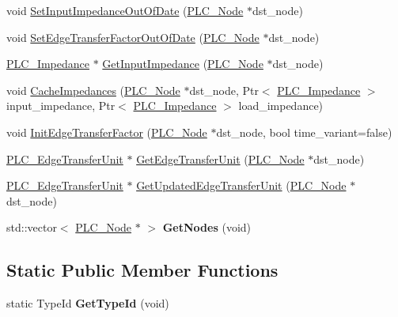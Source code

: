 \begin{DoxyCompactItemize}
\item 
void \hyperlink{classns3_1_1PLC__Edge_a97475cf3a29dc9f37a4decab57f964c9}{\-Set\-Input\-Impedance\-Out\-Of\-Date} (\hyperlink{classns3_1_1PLC__Node}{\-P\-L\-C\-\_\-\-Node} $\ast$dst\-\_\-node)
\item 
void \hyperlink{classns3_1_1PLC__Edge_a6d67f5eed3ae68f7c33b224494a3d47c}{\-Set\-Edge\-Transfer\-Factor\-Out\-Of\-Date} (\hyperlink{classns3_1_1PLC__Node}{\-P\-L\-C\-\_\-\-Node} $\ast$dst\-\_\-node)
\item 
\hyperlink{classns3_1_1PLC__ValueBase}{\-P\-L\-C\-\_\-\-Impedance} $\ast$ \hyperlink{classns3_1_1PLC__Edge_a5db49775230c303010bda7de19982571}{\-Get\-Input\-Impedance} (\hyperlink{classns3_1_1PLC__Node}{\-P\-L\-C\-\_\-\-Node} $\ast$dst\-\_\-node)
\item 
void \hyperlink{classns3_1_1PLC__Edge_af260164445e2242de25261b185f62f90}{\-Cache\-Impedances} (\hyperlink{classns3_1_1PLC__Node}{\-P\-L\-C\-\_\-\-Node} $\ast$dst\-\_\-node, \-Ptr$<$ \hyperlink{classns3_1_1PLC__ValueBase}{\-P\-L\-C\-\_\-\-Impedance} $>$ input\-\_\-impedance, \-Ptr$<$ \hyperlink{classns3_1_1PLC__ValueBase}{\-P\-L\-C\-\_\-\-Impedance} $>$ load\-\_\-impedance)
\item 
void \hyperlink{classns3_1_1PLC__Edge_a99a343e65fcbc15350c8deb977535c5c}{\-Init\-Edge\-Transfer\-Factor} (\hyperlink{classns3_1_1PLC__Node}{\-P\-L\-C\-\_\-\-Node} $\ast$dst\-\_\-node, bool time\-\_\-variant=false)
\item 
\hyperlink{classns3_1_1PLC__EdgeTransferUnit}{\-P\-L\-C\-\_\-\-Edge\-Transfer\-Unit} $\ast$ \hyperlink{classns3_1_1PLC__Edge_a7b02c57ee0502dabd372e5d9d40f66c7}{\-Get\-Edge\-Transfer\-Unit} (\hyperlink{classns3_1_1PLC__Node}{\-P\-L\-C\-\_\-\-Node} $\ast$dst\-\_\-node)
\item 
\hyperlink{classns3_1_1PLC__EdgeTransferUnit}{\-P\-L\-C\-\_\-\-Edge\-Transfer\-Unit} $\ast$ \hyperlink{classns3_1_1PLC__Edge_a56286fb8bc2f9413bc6dbee56755a5ba}{\-Get\-Updated\-Edge\-Transfer\-Unit} (\hyperlink{classns3_1_1PLC__Node}{\-P\-L\-C\-\_\-\-Node} $\ast$dst\-\_\-node)
\item 
\hypertarget{classns3_1_1PLC__Edge_aebba7172ee9bcee3a9d0305b6b6d1470}{std\-::vector$<$ \hyperlink{classns3_1_1PLC__Node}{\-P\-L\-C\-\_\-\-Node} $\ast$ $>$ {\bfseries \-Get\-Nodes} (void)}\label{classns3_1_1PLC__Edge_aebba7172ee9bcee3a9d0305b6b6d1470}

\end{DoxyCompactItemize}
\subsection*{\-Static \-Public \-Member \-Functions}
\begin{DoxyCompactItemize}
\item 
\hypertarget{classns3_1_1PLC__Edge_a1e66231b03f7a4df5a02d15f3b5e4dab}{static \-Type\-Id {\bfseries \-Get\-Type\-Id} (void)}\label{classns3_1_1PLC__Edge_a1e66231b03f7a4df5a02d15f3b5e4dab}

\end{DoxyCompactItemize}
